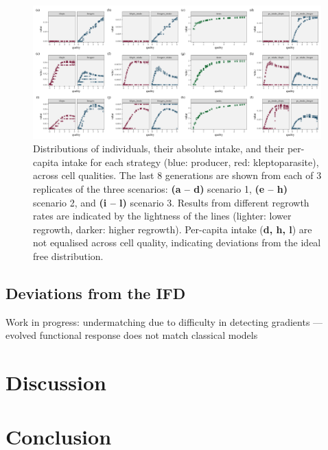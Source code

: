 \documentclass[11pt]{article}
\begin{document}
\begin{figure}[h]
    \includegraphics[width=0.99\textwidth]{figures/fig_06_agent_dist.png}
    \caption{
        Distributions of individuals, their absolute intake, and their per-capita intake for each strategy (blue: producer, red: kleptoparasite), across cell qualities. 
        The last 8 generations are shown from each of 3 replicates of the three scenarios: \textbf{(a -- d)} scenario 1, \textbf{(e -- h)} scenario 2, and \textbf{(i -- l)} scenario 3. Results from different regrowth rates are indicated by the lightness of the lines (lighter: lower regrowth, darker: higher regrowth).
    Per-capita intake (\textbf{d, h, l}) are not equalised across cell quality, indicating deviations from the ideal free distribution.}
\end{figure}

\subsection*{Deviations from the IFD}

Work in progress: undermatching due to difficulty in detecting gradients --- evolved functional response does not match classical models


\section*{Discussion}

\section*{Conclusion}
\end{document}
